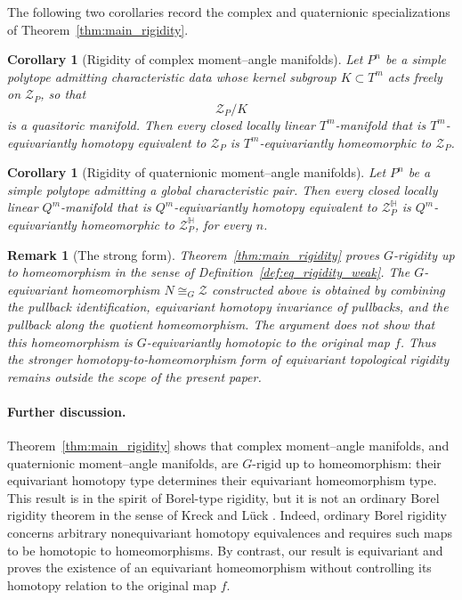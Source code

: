 \documentclass[11pt,a4paper]{article}
\numberwithin{equation}{section}
\newtheorem{remark}[definition]{Remark}
\newtheorem{cor}[definition]{Corollary}
\theoremstyle{named}
\begin{document}
The following two corollaries record the complex and quaternionic specializations of Theorem~\ref{thm:main_rigidity}.

\begin{cor}[Rigidity of complex moment--angle manifolds]
\label{cor:rigidity_complex}
Let \(P^n\) be a simple polytope admitting characteristic data whose kernel subgroup \(K\subset T^m\) acts freely on \(\mathcal Z_P\), so that
\[
    \mathcal Z_P/K
\]
is a quasitoric manifold. Then every closed locally linear \(T^m\)-manifold that is \(T^m\)-equivariantly homotopy equivalent to \(\mathcal Z_P\) is \(T^m\)-equivariantly homeomorphic to \(\mathcal Z_P\).
\end{cor}

\begin{cor}[Rigidity of quaternionic moment--angle manifolds]
\label{cor:rigidity_quaternionic}
Let \(P^n\) be a simple polytope admitting a global characteristic pair. Then every closed locally linear \(Q^m\)-manifold that is \(Q^m\)-equivariantly homotopy equivalent to \(\mathcal Z_P^{\mathbb H}\) is \(Q^m\)-equivariantly homeomorphic to \(\mathcal Z_P^{\mathbb H}\), for every \(n\).
\end{cor}

\begin{remark}[The strong form]
Theorem~\ref{thm:main_rigidity} proves \(G\)-rigidity up to homeomorphism in the sense of Definition~\ref{def:eq_rigidity_weak}. The \(G\)-equivariant homeomorphism \(N\cong_G \mathcal Z\) constructed above is obtained by combining the pullback identification, equivariant homotopy invariance of pullbacks, and the pullback along the quotient homeomorphism. The argument does not show that this homeomorphism is \(G\)-equivariantly homotopic to the original map \(f\).  Thus the stronger homotopy-to-homeomorphism form of equivariant topological rigidity remains outside the scope of the present paper.
\end{remark}

\paragraph*{Further discussion.}
Theorem~\ref{thm:main_rigidity} shows that complex moment--angle manifolds, and quaternionic moment--angle manifolds, are \(G\)-rigid up to homeomorphism: their equivariant homotopy type determines their equivariant homeomorphism type. This result is in the spirit of Borel-type rigidity, but it is not an ordinary Borel rigidity theorem in the sense of Kreck and L\"uck \cite{kl09}. Indeed, ordinary Borel rigidity concerns arbitrary nonequivariant homotopy equivalences and requires such maps to be homotopic to homeomorphisms. By contrast, our result is equivariant and proves the existence of an equivariant homeomorphism without controlling its homotopy relation to the original map \(f\).
\end{document}
